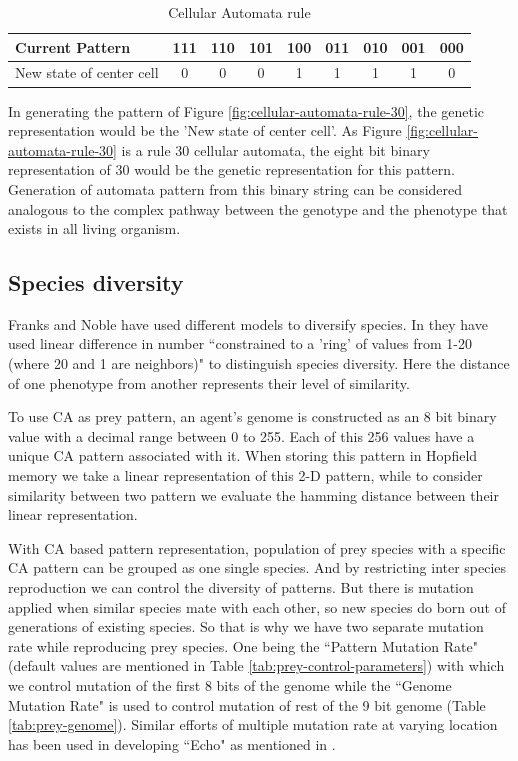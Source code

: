 \begin{table}[H]
	\centering
	\begin{tabular}{| l | c | c | c | c | c | c | c | c |}
	  \hline
	  Current Pattern & 111 & 110 & 101 & 100 & 011 & 010 & 001 & 000 \\ \hline
	  New state of center cell & 0 & 0 & 0 & 1 & 1 & 1 & 1 & 0 \\
	  \hline
	\end{tabular}
	\caption{Cellular Automata rule}
	\label{tab:cellular-automata-rule}
\end{table}

In generating the pattern of Figure \ref{fig:cellular-automata-rule-30}, the genetic representation would be the 'New state of center cell'. As Figure \ref{fig:cellular-automata-rule-30} is a rule 30 cellular automata, the eight bit binary representation of 30 would be the genetic representation for this pattern. Generation of automata pattern from this binary string can be considered analogous to the complex pathway between the genotype and the phenotype that exists in all living organism.

\subsection{Species diversity}
Franks and Noble have used different models to diversify species. In \cite{franks2002} they have used linear difference in number ``constrained to a 'ring' of values  from 1-20 (where 20 and 1 are neighbors)" to distinguish species diversity. Here the distance of one phenotype from another represents their level of similarity. 

To use CA as prey pattern, an agent's genome is constructed as an 8 bit binary value with a decimal range between 0 to 255. Each of this 256 values have a unique CA pattern associated with it. When storing this pattern in Hopfield memory we take a linear representation of this 2-D pattern, while to consider similarity between two pattern we evaluate the hamming distance between their linear representation. 

With CA based pattern representation, population of prey species with a specific CA pattern can be grouped as one single species. And by restricting inter species reproduction we can control the diversity of patterns. But there is mutation applied when similar species mate with each other, so new species do born out of generations of existing species. So that is why we have two separate mutation rate while reproducing prey species. One being the ``Pattern Mutation Rate" (default values are mentioned in Table \ref{tab:prey-control-parameters}) with which we control mutation of the first 8 bits of the genome while the ``Genome Mutation Rate" is used to control mutation of rest of the 9 bit genome (Table \ref{tab:prey-genome}). Similar efforts of multiple mutation rate at varying location has been used in developing ``Echo" as mentioned in \cite{hraber1997}.

